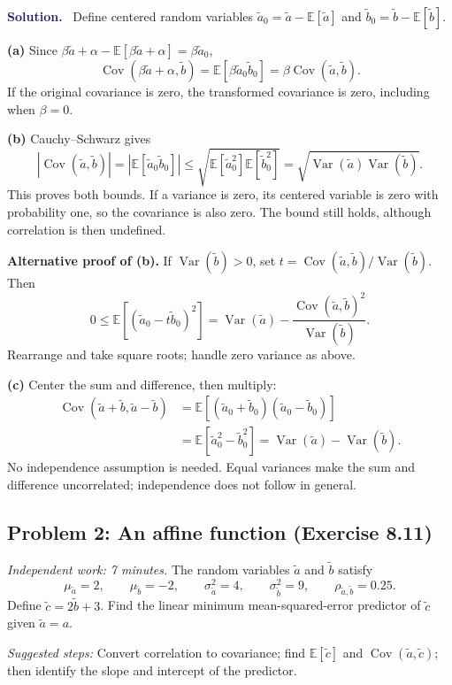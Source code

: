 \documentclass[11pt]{article}
\newcommand{\E}{\mathbb{E}}
\newcommand{\Var}{\operatorname{Var}}
\newcommand{\Cov}{\operatorname{Cov}}
\newcommand{\rv}[1]{\widetilde{#1}}
\newenvironment{answer}{%
    \par\medskip\noindent\textcolor{MidnightBlue}{\textbf{Solution.}}\ }
    {\par\medskip}
\newcommand{\workingspace}[1]{}
\newcommand{\workingspace}[1]{\vspace{#1}}
\begin{document}
\begin{answer}
Define centered random variables
$\rv{a}_0=\rv{a}-\E[\rv{a}]$ and
$\rv{b}_0=\rv{b}-\E[\rv{b}]$.

\textbf{(a)} Since
$\beta\rv{a}+\alpha-\E[\beta\rv{a}+\alpha]=\beta\rv{a}_0$,
\[
  \Cov(\beta\rv{a}+\alpha,\rv{b})
  =\E[\beta\rv{a}_0\rv{b}_0]
  =\beta\Cov(\rv{a},\rv{b}).
\]
If the original covariance is zero, the transformed covariance is zero,
including when $\beta=0$.

\textbf{(b)} Cauchy--Schwarz gives
\[
  |\Cov(\rv{a},\rv{b})|
  =|\E[\rv{a}_0\rv{b}_0]|
  \leq\sqrt{\E[\rv{a}_0^2]\E[\rv{b}_0^2]}
  =\sqrt{\Var(\rv{a})\Var(\rv{b})}.
\]
This proves both bounds. If a variance is zero, its centered variable is
zero with probability one, so the covariance is also zero. The bound still
holds, although correlation is then undefined.

\textbf{Alternative proof of (b).} If $\Var(\rv{b})>0$, set
$t=\Cov(\rv{a},\rv{b})/\Var(\rv{b})$. Then
\[
  0\leq\E[(\rv{a}_0-t\rv{b}_0)^2]
    =\Var(\rv{a})-\frac{\Cov(\rv{a},\rv{b})^2}{\Var(\rv{b})}.
\]
Rearrange and take square roots; handle zero variance as above.

\textbf{(c)} Center the sum and difference, then multiply:
\begin{align*}
  \Cov(\rv{a}+\rv{b},\rv{a}-\rv{b})
    &=\E[(\rv{a}_0+\rv{b}_0)(\rv{a}_0-\rv{b}_0)]\\
    &=\E[\rv{a}_0^2-\rv{b}_0^2]
     =\boxed{\Var(\rv{a})-\Var(\rv{b})}.
\end{align*}
No independence assumption is needed. Equal variances make the sum and
difference uncorrelated; independence does not follow in general.
\end{answer}

\newpage
\subsection*{Problem 2: An affine function (Exercise 8.11)}
\noindent\textit{Independent work: 7 minutes.}
The random variables $\rv{a}$ and $\rv{b}$ satisfy
\[
  \mu_{\rv{a}}=2,\qquad \mu_{\rv{b}}=-2,\qquad
  \sigma_{\rv{a}}^2=4,\qquad \sigma_{\rv{b}}^2=9,\qquad
  \rho_{\rv{a},\rv{b}}=0.25.
\]
Define $\rv{c}=2\rv{b}+3$. Find the linear minimum mean-squared-error
predictor of $\rv{c}$ given $\rv{a}=a$.

\medskip
\noindent\textit{Suggested steps:} Convert correlation to covariance;
find $\E[\rv{c}]$ and $\Cov(\rv{a},\rv{c})$; then identify the slope
and intercept of the predictor.
\workingspace{12cm}
\end{document}
